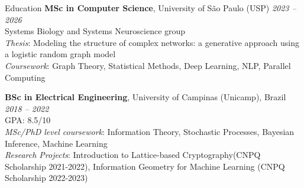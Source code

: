 \documentclass[10pt]{resume}
\begin{document}
\small

\begin{rSection}{Education}
\textbf{MSc in Computer Science}, University of São Paulo (USP) \hfill \textit{2023 -- 2026} \\
Systems Biology and Systems Neuroscience group \\
\textit{Thesis}: Modeling the structure of complex networks: a generative approach using a logistic random graph model \\
\textit{Coursework}: Graph Theory, Statistical Methods, Deep Learning, NLP, Parallel Computing

\vspace{0.2em}
\textbf{BSc in Electrical Engineering}, University of Campinas (Unicamp), Brazil \hfill \textit{2018 -- 2022} \\
\hfill GPA: 8.5/10 \\
\textit{MSc/PhD level coursework}: Information Theory, Stochastic Processes, Bayesian Inference, Machine Learning \\
\textit{Research Projects}: Introduction to Lattice-based Cryptography(CNPQ Scholarship 2021-2022), Information Geometry for Machine Learning (CNPQ Scholarship 2022-2023)
\end{rSection}
\end{document}
